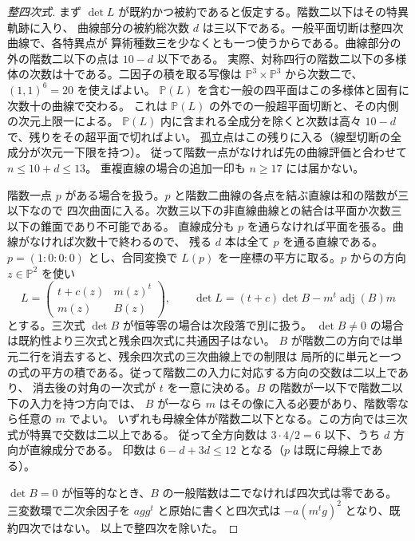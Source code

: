 \begin{proof}[整四次式]
まず $\det L$ が既約かつ被約であると仮定する。階数二以下はその特異軌跡に入り、
曲線部分の被約総次数 $d$ は三以下である。一般平面切断は整四次曲線で、各特異点が
算術種数三を少なくとも一つ使うからである。曲線部分の外の階数二以下の点は $10-d$ 以下である。
実際、対称四行の階数二以下の多様体の次数は十である。二因子の積を取る写像は
$\mathbb P^3\times\mathbb P^3$ から次数二で、$(1,1)^6=20$ を使えばよい。
$\mathbb P(L)$ を含む一般の四平面はこの多様体と固有に次数十の曲線で交わる。
これは $\mathbb P(L)$ の外での一般超平面切断と、その内側の次元上限一による。
$\mathbb P(L)$ 内に含まれる全成分を除くと次数は高々 $10-d$ で、残りをその超平面で切ればよい。
孤立点はこの残りに入る（線型切断の全成分が次元一下限を持つ）。
従って階数一点がなければ先の曲線評価と合わせて $n\le10+d\le13$。
重複直線の場合の追加一印も $n\ge17$ には届かない。

階数一点 $p$ がある場合を扱う。$p$ と階数二曲線の各点を結ぶ直線は和の階数が三以下なので
四次曲面に入る。次数三以下の非直線曲線との結合は平面か次数三以下の錐面であり不可能である。
直線成分も $p$ を通らなければ平面を張る。曲線がなければ次数十で終わるので、
残る $d$ 本は全て $p$ を通る直線である。
$p=(1:0:0:0)$ とし、合同変換で $L(p)$ を一座標の平方に取る。$p$ からの方向 $z\in\mathbb P^2$ を使い
\[
   L=\begin{pmatrix}t+c(z)&m(z)^t\\m(z)&B(z)\end{pmatrix},
   \qquad \det L=(t+c)\det B-m^t\operatorname{adj}(B)m
\]
とする。三次式 $\det B$ が恒等零の場合は次段落で別に扱う。
$\det B\ne0$ の場合は既約性より三次式と残余四次式に共通因子はない。
$B$ が階数二の方向では単元二行を消去すると、残余四次式の三次曲線上での制限は
局所的に単元と一つの式の平方の積である。従って階数二の入力に対応する方向の交数は二以上であり、
消去後の対角の一次式が $t$ を一意に決める。$B$ の階数が一以下で階数二以下の入力を持つ方向では、
$B$ が一なら $m$ はその像に入る必要があり、階数零なら任意の $m$ でよい。
いずれも母線全体が階数二以下となる。この方向では三次式が特異で交数は二以上である。
従って全方向数は $3\cdot4/2=6$ 以下、うち $d$ 方向が直線成分である。
印数は $6-d+3d\le12$ となる（$p$ は既に母線上である）。

$\det B=0$ が恒等的なとき、$B$ の一般階数は二でなければ四次式は零である。
三変数環で二次余因子を $a gg^t$ と原始に書くと四次式は $-a(m^tg)^2$ となり、既約四次ではない。
以上で整四次を除いた。
\end{proof}
